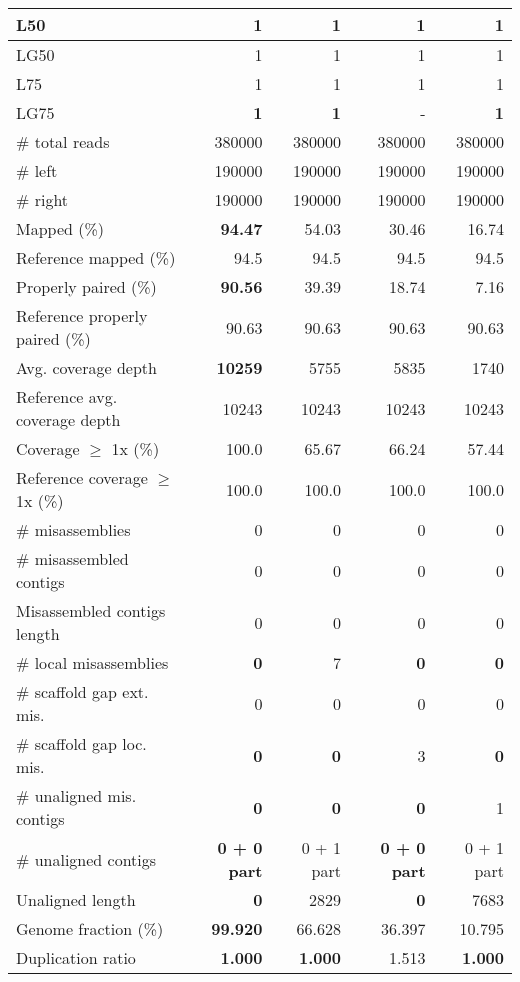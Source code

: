 \documentclass[12pt,a4paper]{article}
\begin{document}
\begin{table}[ht]
\begin{center}
\begin{tabular}{|l*{4}{|r}|}
L50 & 1 & 1 & 1 & 1 \\ \hline
LG50 & 1 & 1 & 1 & 1 \\ \hline
L75 & 1 & 1 & 1 & 1 \\ \hline
LG75 & {\bf 1} & {\bf 1} & - & {\bf 1} \\ \hline
\# total reads & 380000 & 380000 & 380000 & 380000 \\ \hline
\# left & 190000 & 190000 & 190000 & 190000 \\ \hline
\# right & 190000 & 190000 & 190000 & 190000 \\ \hline
Mapped (\%) & {\bf 94.47} & 54.03 & 30.46 & 16.74 \\ \hline
Reference mapped (\%) & 94.5 & 94.5 & 94.5 & 94.5 \\ \hline
Properly paired (\%) & {\bf 90.56} & 39.39 & 18.74 & 7.16 \\ \hline
Reference properly paired (\%) & 90.63 & 90.63 & 90.63 & 90.63 \\ \hline
Avg. coverage depth & {\bf 10259} & 5755 & 5835 & 1740 \\ \hline
Reference avg. coverage depth & 10243 & 10243 & 10243 & 10243 \\ \hline
Coverage $\geq$ 1x (\%) & 100.0 & 65.67 & 66.24 & 57.44 \\ \hline
Reference coverage $\geq$ 1x (\%) & 100.0 & 100.0 & 100.0 & 100.0 \\ \hline
\# misassemblies & 0 & 0 & 0 & 0 \\ \hline
\# misassembled contigs & 0 & 0 & 0 & 0 \\ \hline
Misassembled contigs length & 0 & 0 & 0 & 0 \\ \hline
\# local misassemblies & {\bf 0} & 7 & {\bf 0} & {\bf 0} \\ \hline
\# scaffold gap ext. mis. & 0 & 0 & 0 & 0 \\ \hline
\# scaffold gap loc. mis. & {\bf 0} & {\bf 0} & 3 & {\bf 0} \\ \hline
\# unaligned mis. contigs & {\bf 0} & {\bf 0} & {\bf 0} & 1 \\ \hline
\# unaligned contigs & {\bf 0 + 0 part} & 0 + 1 part & {\bf 0 + 0 part} & 0 + 1 part \\ \hline
Unaligned length & {\bf 0} & 2829 & {\bf 0} & 7683 \\ \hline
Genome fraction (\%) & {\bf 99.920} & 66.628 & 36.397 & 10.795 \\ \hline
Duplication ratio & {\bf 1.000} & {\bf 1.000} & 1.513 & {\bf 1.000} \\ \hline

\end{tabular}
\end{center}
\end{table}
\end{document}
